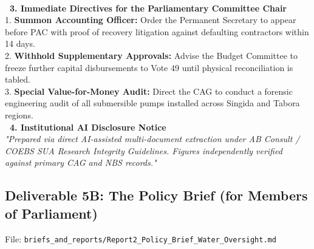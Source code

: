 \documentclass[11pt, a4paper]{report}
\begin{document}
\begin{tcolorbox}[colback=lightgrey, colframe=bordergrey, title=\textbf{Deliverable 5A Preview: \texttt{Report1\_Executive\_Water\_Oversight.md}}]
\begin{tabular}{p{3.2cm}p{2.8cm}p{3.2cm}p{3.6cm}}
\bottomrule
\end{tabular}\\[0.2cm]
\textcolor{tanzaniablue}{\textbf{\ 3. Immediate Directives for the Parliamentary Committee Chair}}\\
1. \textbf{Summon Accounting Officer:} Order the Permanent Secretary to appear before PAC with proof of recovery litigation against defaulting contractors within 14 days.\\
2. \textbf{Withhold Supplementary Approvals:} Advise the Budget Committee to freeze further capital disbursements to Vote 49 until physical reconciliation is tabled.\\
3. \textbf{Special Value-for-Money Audit:} Direct the CAG to conduct a forensic engineering audit of all submersible pumps installed across Singida and Tabora regions.\\[0.2cm]
\textcolor{tanzaniablue}{\textbf{\ 4. Institutional AI Disclosure Notice}}\\
\textit{"Prepared via direct AI-assisted multi-document extraction under AB Consult / COEBS SUA Research Integrity Guidelines. Figures independently verified against primary CAG and NBS records."}
\end{tcolorbox}

\newpage

\subsection{Deliverable 5B: The Policy Brief (for Members of Parliament)}
File: \texttt{briefs\_and\_reports/Report2\_Policy\_Brief\_Water\_Oversight.md}
\end{document}
